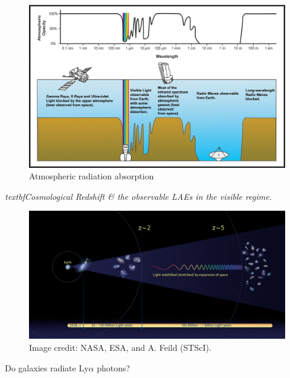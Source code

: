 \documentclass{beamer}
\begin{document}
\begin{frame}
\begin{figure}
\includegraphics[scale=0.8]{Figures/AtmosphericEM.jpg}
\caption*{Atmospheric radiation absorption}
\end{figure}
\end{frame}



\begin{frame}{\textit{textbf{Cosmological Redshift \& the observable LAEs in the visible regime.}}}
\begin{figure}
\includegraphics[scale=0.3]{Figures/expansion.jpg}
\caption*{Image credit: NASA, ESA, and A. Feild (STScI).}
\end{figure}
\end{frame}

\begin{frame}
\begin{center}
\LARGE{Do galaxies radiate Ly$\alpha$ photons?}
\end{center}
\end{frame}
\end{document}
